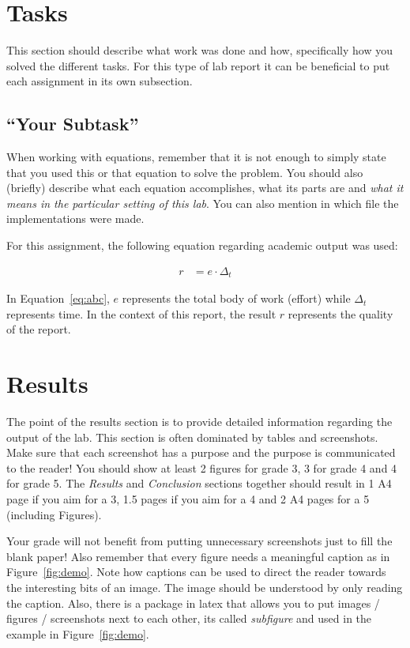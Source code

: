 \documentclass[twocolumn]{article}
\begin{document}
\section{Tasks}
%
This section should describe what work was done and how, specifically how you solved the different tasks. For this type of lab report it can be beneficial to put each assignment in its own subsection.

\subsection{``Your Subtask''}

When working with equations, remember that it is not enough to simply state that you used this or that equation to solve the problem. You should also (briefly) describe what each equation accomplishes, what its parts are and \emph{what it means in the particular setting of this lab}. You can also mention in which file the implementations were made.

\newpage
For this assignment, the following equation regarding academic output was used:

\begin{align}
    r &= e \cdot \Delta_t \label{eq:abc}
\end{align}

In Equation~\ref{eq:abc}, $e$ represents the total body of work (effort) while $\Delta_t$ represents time. In the context of this report, the result $r$ represents the quality of the report.

\section{Results}

The point of the results section is to provide detailed information regarding the output of the lab. This section is often dominated by tables and screenshots. Make sure that each screenshot has a purpose and the purpose is communicated to the reader! You should show at least 2 figures for grade 3, 3 for grade 4 and 4 for grade 5. The \emph{Results} and \emph{Conclusion} sections together should result in 1 A4 page if you aim for a 3, 1.5 pages if you aim for a 4 and 2 A4 pages for a 5 (including Figures).

Your grade will not benefit from putting unnecessary screenshots just to fill the blank paper! Also remember that every figure needs a meaningful caption as in Figure~\ref{fig:demo}. Note how captions can be used to direct the reader towards the interesting bits of an image. The image should be understood by only reading the caption. Also, there is a package in latex that allows you to put images / figures / screenshots next to each other, its called \emph{subfigure} and used in the example in Figure~\ref{fig:demo}.
\end{document}
